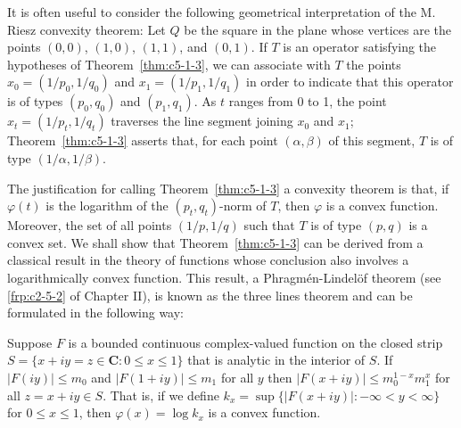 It is often useful to consider the following geometrical interpretation of the
M. Riesz convexity theorem: Let $Q$ be the square in the plane whose vertices
are the points $(0, 0)$, $(1, 0)$, $(1, 1)$, and $(0, 1)$. If $T$ is an operator
satisfying the hypotheses of Theorem~\ref{thm:c5-1-3}, we can associate with
$T$ the points $x_{0} = (1/p_{0}, 1/q_{0})$ and $x_{1} = (1/p_{1}, 1/q_{1})$ in
order to indicate that this operator is of types $(p_{0}, q_{0})$ and
$(p_{1}, q_{1})$. As $t$ ranges from 0 to 1, the point
$x_{t} = (1/p_{t}, 1/q_{t})$ traverses the line segment joining $x_{0}$ and
$x_{1}$; Theorem~\ref{thm:c5-1-3} asserts that, for each point
$(\alpha, \beta)$ of this segment, $T$ is of type $(1/\alpha, 1/\beta)$.

The justification for calling Theorem~\ref{thm:c5-1-3} a convexity theorem is
that, if $\varphi(t)$ is the logarithm of the $(p_{t}, q_{t})$-norm of $T$,
then $\varphi$ is a convex function. Moreover, the set of all points
$(1/p, 1/q)$ such that $T$ is of type $(p, q)$ is a convex set. We shall show
that Theorem~\ref{thm:c5-1-3} can be derived from a classical result in the
theory of functions whose conclusion also involves a logarithmically convex
function. This result, a Phragm\'en-Lindel\"of theorem (see \eqref{frp:c2-5-2}
of Chapter II), is known as the three lines theorem and can be formulated in
the following way:

\begin{lemma}\label{lem:c5-1-4}
Suppose $F$ is a bounded continuous complex-valued function on the closed strip
$S = \{x + iy = z \in \mathbf{C} : 0 \leq x \leq 1\}$ that is analytic in the
interior of $S$. If $|F(iy)| \leq m_{0}$ and $|F(1 + iy)| \leq m_{1}$ for all
$y$ then $|F(x + iy)| \leq m_{0}^{1-x}m_{1}^{x}$ for all $z = x + iy \in S$.
That is, if we define
$k_{x} = \sup\{|F(x + iy)| : -\infty < y < \infty\}$ for $0 \leq x \leq 1$, then
$\varphi(x) = \log k_{x}$ is a convex function.
\end{lemma}

